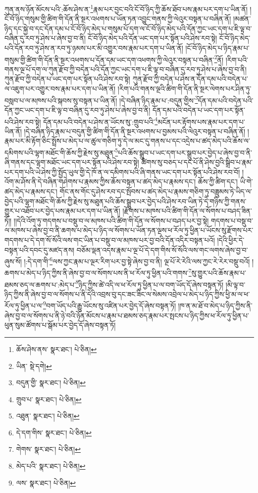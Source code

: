 ཀུན་ནས་ཉོན་མོངས་པའི་:ཆོས་ཤེས་ན་\footnote{ཆོས་ཤེས་ནས་  སྣར་ཐང་།  པེ་ཅིན། }རྣམ་པར་བྱང་བའི་ངོ་བོ་ཉིད་ཀྱི་ཆོས་ཐོབ་པས་རྣམ་པར་དག་པ་ཡིན་ནོ། །ངོ་བོ་ཉིད་གསུམ་གྱི་ཚིག་གི་དོན་ནི་སྔར་འཕགས་པ་ཡོན་ཏན་འབྱུང་གནས་ཀྱི་ལེའུར་བསྟན་པ་བཞིན་ནོ། །མཚན་ཉིད་དང་སྐྱེ་བ་དང་དོན་དམ་པ་ངོ་བོ་ཉིད་མེད་པ་གསུམ་པོ་དག་ལ་ངོ་བོ་ཉིད་མེད་པའི་དོན་ཀྱང་ཡང་དག་པ་ཇི་ལྟ་བ་བཞིན་དུ་རབ་ཏུ་ཤེས་པ་ཞེས་བྱ་བ་ནི། ངོ་བོ་ཉིད་མེད་པའི་དོན་ཡང་དག་པར་སྟོན་པའི་ཤེས་རབ་སྟེ། ངོ་བོ་ཉིད་མེད་པའི་དོན་རབ་ཏུ་ཤེས་ན་རབ་ཏུ་ཉམས་པར་མི་འགྱུར་བས་རྣམ་པར་དག་པ་ཡིན་ནོ། །ངོ་བོ་ཉིད་མེད་པ་ཉིད་རྣམ་པ་གསུམ་གྱི་ཚིག་གི་དོན་ནི་སྔར་འཕགས་པ་དོན་དམ་ཡང་དག་འཕགས་ཀྱི་ལེའུར་བསྟན་པ་བཞིན་\footnote{ཡིན་  སྡེ་དགེ། }ནོ། །རིག་པའི་གནས་ལྔ་པོ་དག་ལ་ཀུན་རྫོབ་ཀྱི་བདེན་པའི་དོན་ཀྱང་ཡང་དག་པ་ཇི་ལྟ་བ་བཞིན་དུ་རབ་ཏུ་ཤེས་པ་ཞེས་བྱ་བ་ནི། ཀུན་རྫོབ་ཀྱི་བདེན་པ་ཡང་དག་པར་སྟོན་པའི་ཤེས་རབ་སྟེ། ཀུན་རྫོབ་ཀྱི་བདེན་པ་ཤེས་ན་དོན་དམ་པའི་བདེན་པ་ལ་འཇུག་པར་འགྱུར་བས་རྣམ་པར་དག་པ་ཡིན་ནོ། །རིག་པའི་གནས་ལྔའི་ཚིག་གི་དོན་ནི་སྔར་ལེགས་པར་ཤིན་ཏུ་བསླབ་པ་ལ་མཁས་པའི་སྐབས་སུ་བསྟན་པ་ཡིན་ནོ། །དེ་བཞིན་ཉིད་རྣམ་པ་:བདུན་གྱིས་\footnote{བདུན་གྱི་  སྣར་ཐང་།  པེ་ཅིན། }དོན་དམ་པའི་བདེན་པའི་དོན་ཀྱང་ཡང་དག་པ་ཇི་ལྟ་བ་བཞིན་དུ་རབ་ཏུ་ཤེས་པ་ཞེས་བྱ་བ་ནི། དོན་དམ་པའི་བདེན་པ་ཡང་དག་པར་སྟོན་པའི་ཤེས་རབ་སྟེ། དོན་དམ་པའི་བདེན་པ་ཤེས་ན་ཡོངས་སུ་:གྲུབ་པའི་\footnote{གྲུབ་པ་  སྣར་ཐང་།  པེ་ཅིན། }མངོན་པར་རྟོགས་པས་རྣམ་པར་དག་པ་ཡིན་ནོ། །དེ་བཞིན་ཉིད་རྣམ་པ་བདུན་གྱི་ཚིག་གི་དོན་ནི་སྔར་འཕགས་པ་བྱམས་པའི་ལེའུར་བསྟན་པ་བཞིན་ནོ། །རྣམ་པར་མི་རྟོག་ཅིང་སྤྲོས་པ་མེད་པ་ལ་ཚུལ་གཅིག་ཏུ་དེ་ལ་མང་དུ་གནས་པ་དང་འདྲེས་པ་ཚད་མེད་པའི་ཆོས་ལ་དམིགས་པའི་ལྷག་མཐོང་གི་ཆོས་ཀྱི་རྗེས་སུ་མཐུན་\footnote{འཐུན་  སྣར་ཐང་།  པེ་ཅིན། }པའི་ཆོས་སྒྲུབ་པ་ཡང་དག་པར་སྒྲུབ་པར་བྱེད་པ་ཞེས་བྱ་བ་ནི་ཞི་གནས་དང་ལྷག་མཐོང་ཡང་དག་པར་སྟོན་པའི་ཤེས་རབ་སྟེ། ཚིགས་སུ་བཅད་པ་དང་པོ་ནི་ཤེས་བྱའི་སྒྲིབ་པ་རྣམ་པར་དག་པའི་ཡེ་ཤེས་ཀྱི་སྤྱོད་ཡུལ་གྱི་དེ་ཁོ་ན་ལ་དམིགས་པའི་ཞི་གནས་ཡང་དག་པར་སྟོན་པའི་ཤེས་རབ་བོ། །འོག་མ་ཤོས་ནི་དེ་བཞིན་གཤེགས་པ་རྣམས་ཀྱིས་ཆོས་བསྟན་པ་ཚད་མེད་པ་རྣམས་དང་། ཆོས་ཀྱི་ཚིག་དང་། ཡི་གེ་ཚད་མེད་པ་རྣམས་དང་། གོང་ནས་གོང་དུ་ཤེས་རབ་དང་སྤོབས་པ་ཚད་མེད་པ་རྣམས་གཅིག་ཏུ་བཟླུམས་ཏེ་ཡིད་ལ་བྱེད་པའི་ལྷག་མཐོང་གི་ཆོས་ཀྱི་རྗེས་སུ་མཐུན་པའི་ཆོས་སྒྲུབ་པར་བྱེད་པའི་ཤེས་རབ་ཡིན་ཏེ་དེ་གཉིས་ཀྱི་གནས་གྱུར་པ་འཐོབ་པར་བྱེད་པས་རྣམ་པར་དག་པ་ཡིན་ནོ། །རྫོགས་པ་མཁས་པའི་ཚིག་གི་དོན་ལ་སོགས་པ་བཤད་ཟིན་ཏོ།། །།དེའི་འོག་ཏུ་གདགས་པ་བསྡུ་བ་ལ་མཁས་པའི་ཚིག་གི་དོན་ལ་སོགས་པ་བཤད་པར་བྱ་སྟེ། གདགས་པ་བསྡུ་བ་ལ་མཁས་པ་ཞེས་བྱ་བ་ནི་ཆགས་པ་མེད་པ་ཉིད་ལ་སོགས་པ་ཡོན་ཏན་ལྔས་ཕ་རོལ་ཏུ་ཕྱིན་པ་ཡོངས་སུ་རྫོགས་པར་གདགས་པ་དེ་དག་སོ་སོའི་ལས་གང་ཡིན་པ་བསྡུ་བ་ལ་མཁས་པར་བྱ་བའི་དོན་འདིར་བསྟན་པའོ། །དེའི་ཕྱིར་དེ་བསྟན་པའི་དབང་དུ་མཛད་ནས། བཅོམ་ལྡན་འདས་རྣམ་པ་ལྔ་པོ་དེ་དག་གིས་སོ་སོའི་ལས་གང་ལགས་ཞེས་བྱ་བ་ཞུས་སོ། །:དེ་དག་གི་\footnote{དེ་དག་གིས་  སྣར་ཐང་།  པེ་ཅིན། }ལས་ཀྱང་རྣམ་པ་ལྔར་རིག་པར་བྱ་སྟེ་ཞེས་བྱ་བ་ནི། ལྔ་པོ་རེ་རེའི་ལས་ཀྱང་རེ་རེར་བསྡུ་བའོ། །ཆགས་པ་མེད་པ་ཉིད་ཀྱིས་ནི་ཞེས་བྱ་བ་ལ་སོགས་པས་ནི་ཕ་རོལ་ཏུ་ཕྱིན་པའི་གགས་\footnote{གེགས་  སྣར་ཐང་།  པེ་ཅིན། }སུ་གྱུར་པའི་ཆོས་རྣམ་པ་ཐམས་ཅད་ལ་ཆགས་པ་:མེད་པ་\footnote{མེད་པའི་  སྣར་ཐང་།  པེ་ཅིན། }ཉིད་ཀྱིས་ཚེ་འདི་ལ་ཕ་རོལ་ཏུ་ཕྱིན་པ་ལ་བག་ཡོད་དོ་ཞེས་བསྟན་ཏོ། །མི་ལྟ་བ་ཉིད་ཀྱིས་ནི་ཞེས་བྱ་བ་ལ་སོགས་པ་ནི་དེའི་འབྲས་བུ་དང་ཟང་ཟིང་ལ་སེམས་འབྲེལ་པ་མེད་པ་ཉིད་ཀྱིས་ཕྱི་མ་ལ་ཕ་རོལ་ཏུ་ཕྱིན་པ་ལ་\footnote{ལས་  སྣར་ཐང་།  པེ་ཅིན། }བག་ཡོད་པའི་རྒྱུ་ཡོངས་སུ་འཛིན་པར་བྱེད་དོ་ཞེས་བསྟན་ཏོ། །ཁ་ན་མ་ཐོ་བ་མེད་པ་ཉིད་ཀྱིས་ནི་ཞེས་བྱ་བ་ལ་སོགས་པ་ནི་ཉེ་བའི་ཉོན་མོངས་པ་རྣམ་པ་ཐམས་ཅད་རྣམ་པར་སྤངས་པ་ཉིད་ཀྱིས་ཕ་རོལ་ཏུ་ཕྱིན་པ་ཕུན་སུམ་ཚོགས་པ་སྒོམ་པར་བྱེད་དོ་ཞེས་བསྟན་ཏོ། 